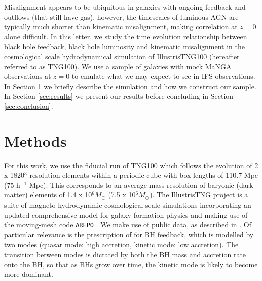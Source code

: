 \documentclass[fleqn,usenatbib]{mnras}
\newcommand{\red}[1]{{\textcolor{red}{#1}}}
\begin{document}

Misalignment appears to be ubiquitous in galaxies with ongoing feedback and outflows (that still have gas), however, the timescales of luminous AGN are typically much shorter than kinematic misalignment, making correlation at $z=0$ alone difficult. In this letter, we study the time evolution relationship between black hole feedback, black hole luminosity and kinematic misalignment in the cosmological scale hydrodynamical simulation of IllustrisTNG100 (hereafter referred to as TNG100). We use a sample of galaxies with mock MaNGA \citep[Mapping Galaxies at Apache Point;][]{bundy2015, blanton2017} observations at $z=0$ to emulate what we may expect to see in IFS observations. In Section \ref{sec:methods} we briefly describe the simulation and how we construct our sample. In Section \ref{sec:results} we present our results before concluding in Section \ref{sec:conclusion}.

\section{Methods} \label{sec:methods}
For this work, we use the fiducial run of TNG100 which follows the evolution of 2 x 1820$^3$ resolution elements within a periodic cube with box lengths of 110.7 Mpc (75 h$^{-1}$ Mpc). This corresponds to an average mass resolution of baryonic (dark matter) elements of 1.4 x 10$^6 M_{\odot}$ (7.5 x 10$^6 M_{\odot}$). The IllustrisTNG project \citep{marinacci18,naiman18,nelson18,pillepich18b,springel18} is a suite of magneto-hydrodynamic cosmological scale simulations incorporating an updated comprehensive model for galaxy formation physics \citep[][]{weinberger17,pillepich18a} and making use of the moving-mesh code \texttt{AREPO} \citep{springel10,pakmor11,pakmor13}. We make use of public data, as described in \citet{nelson2019}. Of particular relevance is the prescription of \citet{weinberger17} for BH feedback, which is modelled by two modes (quasar mode: high accretion, kinetic mode: low accretion). The transition between modes is dictated by both the BH mass and accretion rate onto the BH, so that as BHs grow over time, the kinetic mode is likely to become more dominant. 
\end{document}
